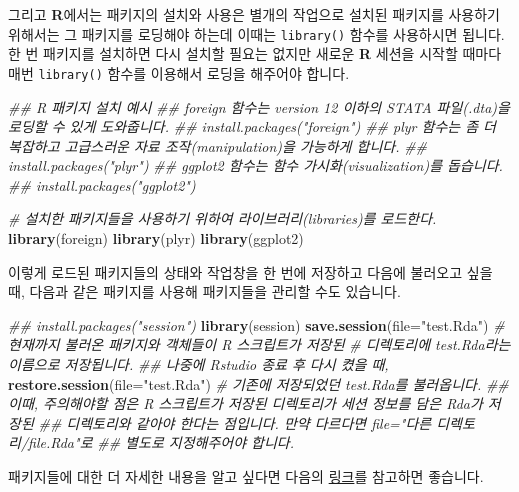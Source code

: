 \documentclass[]{book}
\newenvironment{Shaded}{\begin{snugshade}}{\end{snugshade}}
\newcommand{\CommentTok}[1]{\textcolor[rgb]{0.56,0.35,0.01}{\textit{#1}}}
\newcommand{\DataTypeTok}[1]{\textcolor[rgb]{0.13,0.29,0.53}{#1}}
\newcommand{\KeywordTok}[1]{\textcolor[rgb]{0.13,0.29,0.53}{\textbf{#1}}}
\newcommand{\NormalTok}[1]{#1}
\newcommand{\StringTok}[1]{\textcolor[rgb]{0.31,0.60,0.02}{#1}}
\begin{document}
그리고 \textbf{R}에서는 패키지의 설치와 사용은 별개의 작업으로 설치된 패키지를 사용하기 위해서는 그 패키지를 로딩해야 하는데 이때는 \texttt{library()} 함수를 사용하시면 됩니다. 한 번 패키지를 설치하면 다시 설치할 필요는 없지만 새로운 \textbf{R} 세션을 시작할 때마다 매번 \texttt{library()} 함수를 이용해서 로딩을 해주어야 합니다.

\begin{Shaded}
\begin{Highlighting}[]
\CommentTok{## R 패키지 설치 예시}
\CommentTok{## foreign 함수는 version 12 이하의 STATA 파일(.dta)을 로딩할 수 있게 도와줍니다.}
\CommentTok{## install.packages("foreign")}
\CommentTok{## plyr 함수는 좀 더 복잡하고 고급스러운 자료 조작(manipulation)을 가능하게 합니다.}
\CommentTok{## install.packages("plyr")}
\CommentTok{## ggplot2 함수는 함수 가시화(visualization)를 돕습니다.}
\CommentTok{## install.packages("ggplot2")}

\CommentTok{# 설치한 패키지들을 사용하기 위하여 라이브러리(libraries)를 로드한다.}
\KeywordTok{library}\NormalTok{(foreign)}
\KeywordTok{library}\NormalTok{(plyr)}
\KeywordTok{library}\NormalTok{(ggplot2)}
\end{Highlighting}
\end{Shaded}

이렇게 로드된 패키지들의 상태와 작업창을 한 번에 저장하고 다음에 불러오고 싶을 때, 다음과 같은 패키지를 사용해 패키지들을 관리할 수도 있습니다.

\begin{Shaded}
\begin{Highlighting}[]
\CommentTok{## install.packages("session")}
\KeywordTok{library}\NormalTok{(session)}
\KeywordTok{save.session}\NormalTok{(}\DataTypeTok{file=}\StringTok{"test.Rda"}\NormalTok{) }\CommentTok{# 현재까지 불러온 패키지와 객체들이 R 스크립트가 저장된}
                              \CommentTok{# 디렉토리에 test.Rda라는 이름으로 저장됩니다.}
\CommentTok{## 나중에 Rstudio 종료 후 다시 켰을 때,}
\KeywordTok{restore.session}\NormalTok{(}\DataTypeTok{file=}\StringTok{"test.Rda"}\NormalTok{) }\CommentTok{# 기존에 저장되었던 test.Rda를 불러옵니다.}
\CommentTok{## 이때, 주의해야할 점은 R 스크립트가 저장된 디렉토리가 세션 정보를 담은 Rda가 저장된}
\CommentTok{## 디렉토리와 같아야 한다는 점입니다. 만약 다르다면 file="다른 디렉토리/file.Rda"로 }
\CommentTok{## 별도로 지정해주어야 합니다.}
\end{Highlighting}
\end{Shaded}

패키지들에 대한 더 자세한 내용을 알고 싶다면 다음의 \href{https://www.datacamp.com/community/tutorials/r-packages-guide}{링크}를 참고하면 좋습니다.
\end{document}
